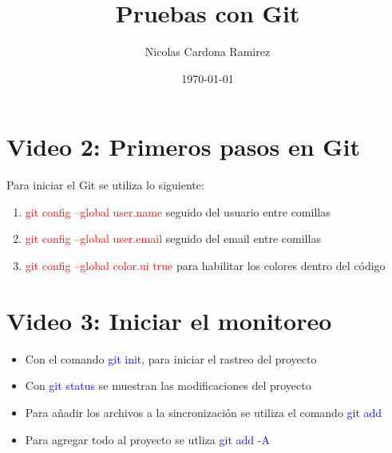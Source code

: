 \documentclass{article}
\title{Pruebas con Git}
\author{Nicolas Cardona Ramirez}
\date{\today}
\begin{document}
	
	\maketitle
	
	\section{Video 2: Primeros pasos en Git}
	
	
	Para iniciar el Git se utiliza lo siguiente:
	\begin{enumerate}
		\item \textcolor{red}{git config --global user.name} seguido del usuario entre comillas
		\item \textcolor{red}{git config --global user.email} seguido del email entre comillas
		\item \textcolor{red}{git config --global color.ui true} para habilitar los colores dentro del código
	\end{enumerate}
	
	\section{Video 3: Iniciar el monitoreo}
	
	\begin{itemize}
		\item Con el comando \textcolor{blue}{git init}, para iniciar el rastreo del proyecto
		\item Con \textcolor{blue}{git status} se muestran las modificaciones del proyecto
		\item Para añadir los archivos a la sincronización se utiliza el comando \textcolor{blue}{git add}
		\item Para agregar todo al proyecto se utliza \textcolor{blue}{git add -A}
	\end{itemize}

	
	
\end{document}
